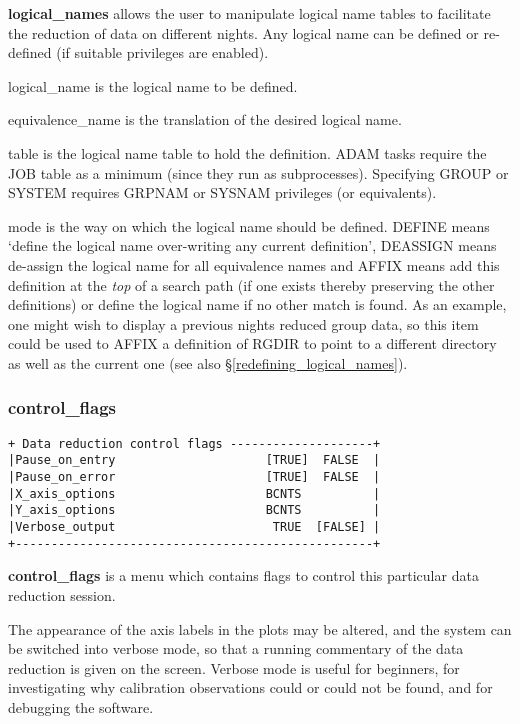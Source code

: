 {{\bf logical\_names} allows the user to manipulate logical name tables to
facilitate the reduction of data on different nights. Any logical name can
be defined or re-defined (if suitable privileges are enabled).

{\sf logical\_name} is the logical name to be defined.

{\sf equivalence\_name} is the translation of the desired logical name.

{\sf table} is the logical name table to hold the definition. ADAM tasks
require the JOB table as a minimum (since they run as subprocesses).
Specifying GROUP or SYSTEM requires GRPNAM or SYSNAM privileges 
(or equivalents).

{\sf mode} is the way on which the logical name should be defined. {\sf DEFINE}
means `define the logical name over-writing any current definition',
{\sf DEASSIGN} means de-assign the logical name for all equivalence names and
{\sf AFFIX} means add this definition at the {\em top} of a search path (if one
exists thereby preserving the other definitions) or define the logical
name if no other match is found. As an example, one might wish to display a
previous nights reduced group data, so this item could be used to {\sf AFFIX} a
definition of {\sf RGDIR} to point to a different directory as well as the 
current one (see also \S \ref{redefining_logical_names}).

\subsubsection{control\_flags}
\label{control_flags}
\begin{verbatim}
+ Data reduction control flags --------------------+
|Pause_on_entry                     [TRUE]  FALSE  |
|Pause_on_error                     [TRUE]  FALSE  |
|X_axis_options                     BCNTS          |
|Y_axis_options                     BCNTS          |
|Verbose_output                      TRUE  [FALSE] |
+--------------------------------------------------+
\end{verbatim}

{\bf control\_flags} is a menu which contains flags to control this
particular data reduction session.

The appearance of the axis labels in the plots may be altered, and the 
system can be switched into {\sf verbose mode}, so that a running 
commentary of the data reduction is given on the screen.
Verbose mode is useful for beginners, for investigating why calibration 
observations could or could not be found, and for debugging the software.

}
